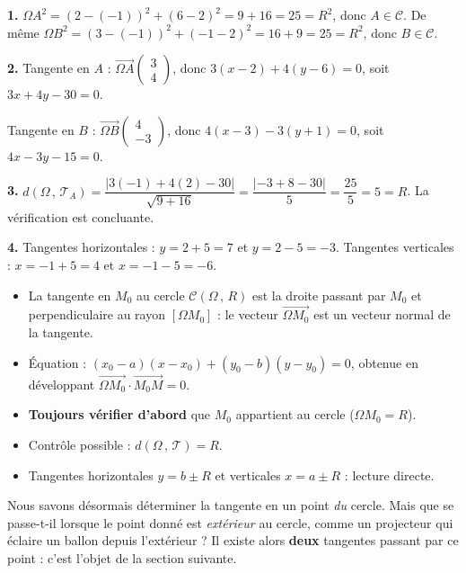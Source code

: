 \documentclass[11pt]{article}
\newcommand{\cle}[1]{{\popxbold\color{popdark}#1}}
\begin{document}
\begin{corrige}
\textbf{1.} $\Omega A^2 = (2-(-1))^2 + (6-2)^2 = 9 + 16 = 25 = R^2$, donc $A \in \mathcal{C}$. De même $\Omega B^2 = (3-(-1))^2 + (-1-2)^2 = 16 + 9 = 25 = R^2$, donc $B \in \mathcal{C}$.

\textbf{2.} Tangente en $A$ : $\overrightarrow{\Omega A}\begin{pmatrix} 3 \\ 4 \end{pmatrix}$, donc $3(x - 2) + 4(y - 6) = 0$, soit $3x + 4y - 30 = 0$.

Tangente en $B$ : $\overrightarrow{\Omega B}\begin{pmatrix} 4 \\ -3 \end{pmatrix}$, donc $4(x - 3) - 3(y + 1) = 0$, soit $4x - 3y - 15 = 0$.

\textbf{3.} $d(\Omega\,,\,\mathcal{T}_A) = \dfrac{|3(-1) + 4(2) - 30|}{\sqrt{9 + 16}} = \dfrac{|-3 + 8 - 30|}{5} = \dfrac{25}{5} = 5 = R$. La vérification est concluante.

\textbf{4.} Tangentes horizontales : $y = 2 + 5 = 7$ et $y = 2 - 5 = -3$. Tangentes verticales : $x = -1 + 5 = 4$ et $x = -1 - 5 = -6$.
\end{corrige}

\begin{aretenir}
\begin{itemize}
\item La tangente en $M_0$ au cercle $\mathcal{C}(\Omega\,,\,R)$ est la droite passant par $M_0$ et perpendiculaire au rayon $[\Omega M_0]$ : le vecteur $\overrightarrow{\Omega M_0}$ est un \cle{vecteur normal} de la tangente.
\item Équation : $(x_0 - a)(x - x_0) + (y_0 - b)(y - y_0) = 0$, obtenue en développant $\overrightarrow{\Omega M_0}\cdot\overrightarrow{M_0 M} = 0$.
\item \textbf{Toujours vérifier d'abord} que $M_0$ appartient au cercle ($\Omega M_0 = R$).
\item Contrôle possible : $d(\Omega\,,\,\mathcal{T}) = R$.
\item Tangentes horizontales $y = b \pm R$ et verticales $x = a \pm R$ : lecture directe.
\end{itemize}
\end{aretenir}

Nous savons désormais déterminer la tangente en un point \emph{du} cercle. Mais que se passe-t-il lorsque le point donné est \emph{extérieur} au cercle, comme un projecteur qui éclaire un ballon depuis l'extérieur ? Il existe alors \textbf{deux} tangentes passant par ce point : c'est l'objet de la section suivante.
\end{document}
